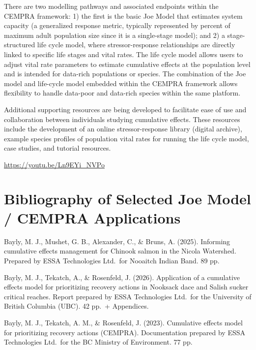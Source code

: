 \documentclass[
  letterpaper,
  DIV=11,
  numbers=noendperiod]{scrreprt}
\begin{document}
There are two modelling pathways and associated endpoints within the
CEMPRA framework: 1) the first is the basic Joe Model that estimates
system capacity (a generalized response metric, typically represented by
percent of maximum adult population size since it is a single-stage
model); and 2) a stage-structured life cycle model, where
stressor-response relationships are directly linked to specific life
stages and vital rates. The life cycle model allows users to adjust
vital rate parameters to estimate cumulative effects at the population
level and is intended for data-rich populations or species. The
combination of the Joe model and life-cycle model embedded within the
CEMPRA framework allows flexibility to handle data-poor and data-rich
species within the same platform.

Additional supporting resources are being developed to facilitate ease
of use and collaboration between individuals studying cumulative
effects. These resources include the development of an online
stressor-response library (digital archive), example species profiles of
population vital rates for running the life cycle model, case studies,
and tutorial resources.

\url{https://youtu.be/Ln9EYi_NVPo}

\section*{Bibliography of Selected Joe Model / CEMPRA
Applications}\label{bibliography-of-selected-joe-model-cempra-applications}


Bayly, M. J., Mushet, G. B., Alexander, C., \& Bruns, A. (2025).
Informing cumulative effects management for Chinook salmon in the Nicola
Watershed. Prepared by ESSA Technologies Ltd.~for Nooaitch Indian Band.
89 pp.

Bayly, M. J., Tekatch, A., \& Rosenfeld, J. (2026). Application of a
cumulative effects model for prioritizing recovery actions in Nooksack
dace and Salish sucker critical reaches. Report prepared by ESSA
Technologies Ltd.~for the University of British Columbia (UBC). 42 pp.~+
Appendices.

Bayly, M. J., Tekatch, A. M., \& Rosenfeld, J. (2023). Cumulative
effects model for prioritizing recovery actions (CEMPRA). Documentation
prepared by ESSA Technologies Ltd.~for the BC Ministry of Environment.
77 pp.
\end{document}
